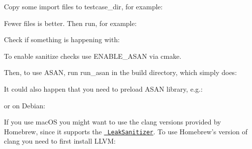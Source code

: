 \begin{DoxyCode}{0}
\end{DoxyCode}


Copy some import files to {\ttfamily testcase\+\_\+dir}, for example\+:


\begin{DoxyCode}{0}
\end{DoxyCode}


Fewer files is better. Then run, for example\+:


\begin{DoxyCode}{0}
\end{DoxyCode}


Check if something is happening with\+:


\begin{DoxyCode}{0}
\end{DoxyCode}


To enable sanitize checks use {\ttfamily E\+N\+A\+B\+L\+E\+\_\+\+A\+S\+AN} via cmake.

Then, to use A\+S\+AN, run {\ttfamily run\+\_\+asan} in the build directory, which simply does\+:


\begin{DoxyCode}{0}
\end{DoxyCode}


It could also happen that you need to preload A\+S\+AN library, e.\+g.\+:


\begin{DoxyCode}{0}
\end{DoxyCode}


or on Debian\+:


\begin{DoxyCode}{0}
\end{DoxyCode}


If you use mac\+OS you might want to use the {\ttfamily clang} versions provided by Homebrew, since it supports the \href{https://github.com/google/sanitizers/wiki/AddressSanitizerLeakSanitizer}{\texttt{ Leak\+Sanitizer}}. To use Homebrew’s version of {\ttfamily clang} you need to first install L\+L\+VM\+:


